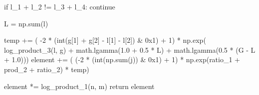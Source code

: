 \begin{python}
                                    if l_1 + l_2 != l_3 + l_4:
                                        continue

                                    L = np.sum(l)

                                    temp += (
                                        -2
                                        * (int(g[1] + g[2] - l[1] - l[2]) & 0x1)
                                        + 1) 
                                        * np.exp(
                                        log_product_3(l, g)
                                        + math.lgamma(1.0 + 0.5 * L)
                                        + math.lgamma(0.5 * (G - L + 1.0)))
                    element += (
                        (-2 * (int(np.sum(j)) & 0x1) + 1)
                        * np.exp(ratio_1 + prod_2 + ratio_2)
                        * temp)

    element *= log_product_1(n, m)
    return element
\end{python}